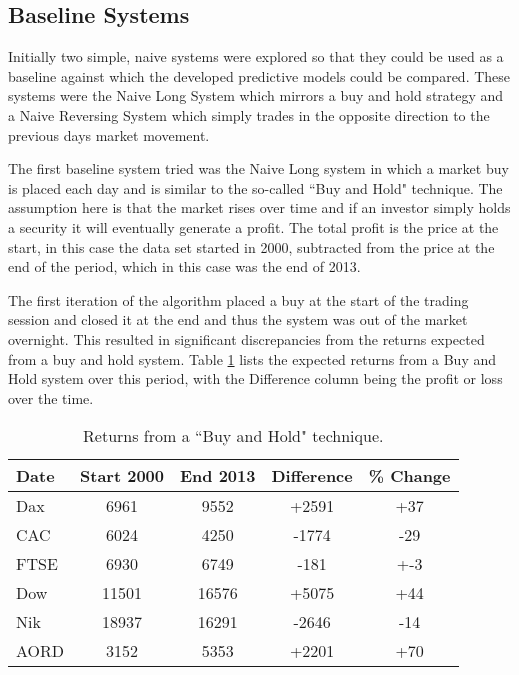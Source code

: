 %

%

\subsection{Baseline Systems}
Initially two simple, naive systems were explored so that they could be used as a baseline against which the developed predictive models could be compared. These systems were the Naive Long System which mirrors a buy and hold strategy and a Naive Reversing System which simply trades in the opposite direction to the previous days market movement.

The first baseline system tried was the Naive Long system in which a market buy is placed each day and is similar to the so-called \textquotedblleft Buy and Hold" technique. The assumption here is that the market rises over time and if an investor simply holds a security it will eventually generate a profit.  The total profit is the price at the start, in this case the data set started in 2000, subtracted from the price at the end of the period, which in this case was the end of 2013.

The first iteration of the algorithm placed a buy at the start of the trading session and closed it at the end and thus the system was out of the market overnight. This resulted in significant discrepancies from the returns expected from a buy and hold system. Table \ref{tab:ind_start_stop_chp6} lists the expected returns from a Buy and Hold system over this period, with the Difference column being the profit or loss over the time.

\begin{table}[!htbp] \centering  
\caption[Returns from a  \textquotedblleft Buy and Hold" technique]{Returns from a  \textquotedblleft Buy and Hold" technique.}
\label{tab:ind_start_stop_chp6}
\begin{tabular}{lcccc}
\toprule
Date & Start 2000 & End 2013 & Difference & \% Change  \\
\midrule
Dax & 6961 & 9552   & +2591 & +37 \\
CAC & 6024 & 4250   & -1774 & -29 \\
FTSE & 6930 & 6749  & -181  & +-3 \\
Dow & 11501 & 16576 & +5075 & +44 \\
Nik & 18937 & 16291 & -2646 & -14 \\
AORD & 3152 & 5353  & +2201 & +70 \\
\bottomrule
\end{tabular}
\end{table}

